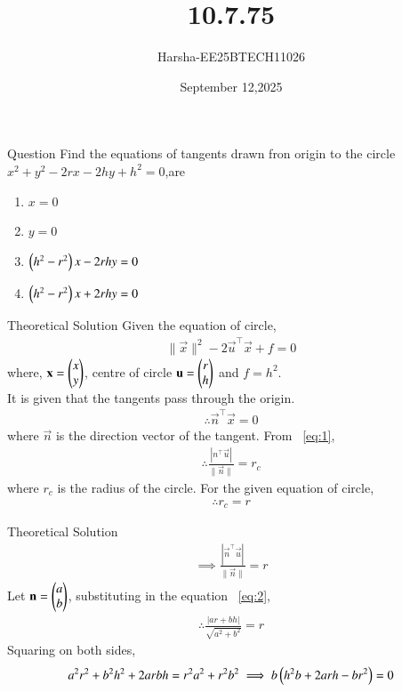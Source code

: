 \documentclass{beamer}
\title %
{10.7.75}
\date{September 12,2025}
\author %
{Harsha-EE25BTECH11026}
\begin{document}
\frame{\titlepage}


\begin{frame}{Question}
Find the equations of tangents drawn fron origin to the circle $x^2+y^2-2rx-2hy+h^2=0$,are
\begin{enumerate}
    \item $x=0$
    \item $y=0$
    \item $\left(h^2-r^2\right)x-2rhy=0$
    \item $\left(h^2-r^2\right)x+2rhy=0$
\end{enumerate}
\end{frame}

\begin{frame}{Theoretical Solution}
Given the equation of circle,
\begin{align}
    \|\vec{x}\|^2-2\vec{u}^{\top}\vec{x}+f=0 \label{eq:1}
\end{align}
where, $\mathbf{x}=\begin{pmatrix}x\\y\end{pmatrix}$, centre of circle $\mathbf{u}=\begin{pmatrix}r\\h\end{pmatrix}$ and $f=h^2$.\\ 
It is given that the tangents pass through the origin.
\begin{align}
    \therefore \vec{n}^{\top}\vec{x}=0
\end{align}
where $\vec{n}$ is the direction vector of the tangent.
From ~\eqref{eq:1},
\begin{align}
    \therefore \frac{|n^{\top}\vec{u}|}{\|\vec{n}\|}=r_c
\end{align}
where $r_c$ is the radius of the circle. For the given equation of circle,
\begin{align}
    \therefore r_c=r
\end{align}
\end{frame}

\begin{frame}{Theoretical Solution}
\begin{align}
    \implies \frac{|\vec{n}^{\top}\vec{u}|}{\|\vec{n}\|}=r \label{eq:2}
\end{align}
Let $\mathbf{n}=\begin{pmatrix}a\\b\end{pmatrix}$, substituting in the equation ~\eqref{eq:2},
\begin{align}
    \therefore \frac{|ar+bh|}{\sqrt{a^2+b^2}}=r
\end{align}
Squaring on both sides,
\begin{align}
    a^2r^2+b^2h^2+2arbh=r^2a^2+r^2b^2 \implies b\left(h^2b+2arh-br^2\right)=0
    \label{eq:3}
\end{align}
\end{frame}
\end{document}

